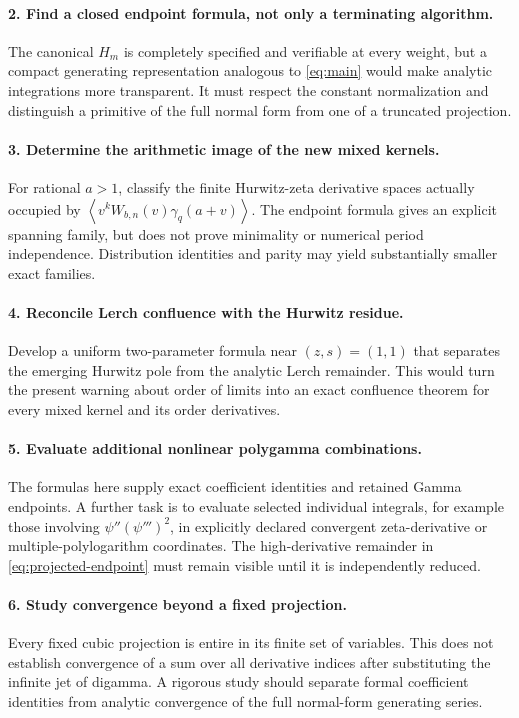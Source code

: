 \documentclass[11pt]{article}
\numberwithin{equation}{section}
\theoremstyle{definition}\newtheorem{definition}[theorem]{Definition}
\theoremstyle{remark}\newtheorem{remark}[theorem]{Remark}
\newcommand{\avg}[1]{\left\langle #1\right\rangle}
\begin{document}
\paragraph{2. Find a closed endpoint formula, not only a terminating algorithm.}
The canonical $H_m$ is completely specified and verifiable at every
weight, but a compact generating representation analogous to
\eqref{eq:main} would make analytic integrations more transparent. It must
respect the constant normalization and distinguish a primitive of the
full normal form from one of a truncated projection.

\paragraph{3. Determine the arithmetic image of the new mixed kernels.}
For rational $a>1$, classify the finite Hurwitz-zeta derivative spaces
actually occupied by $\avg{v^kW_{b,n}(v)\gamma_q(a+v)}$. The endpoint
formula gives an explicit spanning family, but does not prove minimality
or numerical period independence. Distribution identities and parity may
yield substantially smaller exact families.

\paragraph{4. Reconcile Lerch confluence with the Hurwitz residue.}
Develop a uniform two-parameter formula near $(z,s)=(1,1)$ that separates
the emerging Hurwitz pole from the analytic Lerch remainder. This would
turn the present warning about order of limits into an exact confluence
theorem for every mixed kernel and its order derivatives.

\paragraph{5. Evaluate additional nonlinear polygamma combinations.}
The formulas here supply exact coefficient identities and retained
Gamma endpoints. A further task is to evaluate selected individual
integrals, for example those involving $\psi''(\psi''')^2$, in explicitly
declared convergent zeta-derivative or multiple-polylogarithm coordinates.
The high-derivative remainder in \eqref{eq:projected-endpoint} must remain
visible until it is independently reduced.

\paragraph{6. Study convergence beyond a fixed projection.}
Every fixed cubic projection is entire in its finite set of variables.
This does not establish convergence of a sum over all derivative indices
after substituting the infinite jet of digamma. A rigorous study should
separate formal coefficient identities from analytic convergence of the
full normal-form generating series.
\end{document}
